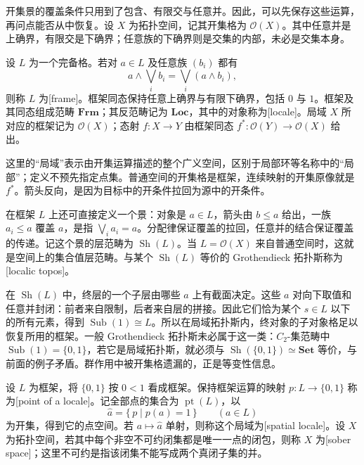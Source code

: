 开集景的覆盖条件只用到了包含、有限交与任意并。因此，可以先保存这些运算，再问点能否从中恢复。设 \(X\) 为拓扑空间，记其开集格为 \(\mathcal O(X)\)。其中任意并是上确界，有限交是下确界；任意族的下确界则是交集的内部，未必是交集本身。

\begin{definition}\label{b4:def:frame-locale}
	设 \(L\) 为一个完备格。若对 \(a\in L\) 及任意族 \((b_i)\) 都有
	\[
		a\wedge\bigvee_i b_i=\bigvee_i(a\wedge b_i),
	\]
	则称 \(L\) 为[frame]。框架同态保持任意上确界与有限下确界，包括 \(0\) 与 \(1\)。框架及其同态组成范畴 \(\mathbf{Frm}\)；其反范畴记为 \(\mathbf{Loc}\)，其中的对象称为[locale]。局域 \(X\) 所对应的框架记为 \(\mathcal O(X)\)；态射 \(f:X\to Y\) 由框架同态 \(f^*:\mathcal O(Y)\to\mathcal O(X)\) 给出。
\end{definition}

这里的“局域”表示由开集运算描述的整个广义空间，区别于局部环等名称中的“局部”；定义不预先指定点集。普通空间的开集格是框架，连续映射的开集原像就是 \(f^*\)。箭头反向，是因为目标中的开条件拉回为源中的开条件。

\ProseParagraphBreak
在框架 \(L\) 上还可直接定义一个景：对象是 \(a\in L\)，箭头由 \(b\le a\) 给出，一族 \(a_i\le a\) 覆盖 \(a\)，是指 \(\bigvee_i a_i=a\)。分配律保证覆盖的拉回，任意并的结合保证覆盖的传递。记这个景的层范畴为 \(\operatorname{Sh}(L)\)。当 \(L=\mathcal O(X)\) 来自普通空间时，这就是空间上的集合值层范畴。与某个 \(\operatorname{Sh}(L)\) 等价的 Grothendieck 拓扑斯称为[localic topos]。

\ProseParagraphBreak
在 \(\operatorname{Sh}(L)\) 中，终层的一个子层由哪些 \(a\) 上有截面决定。这些 \(a\) 对向下取值和任意并封闭：前者来自限制，后者来自层的拼接。因此它们恰为某个 \(s\in L\) 以下的所有元素，得到 \(\operatorname{Sub}(1)\cong L\)。所以在局域拓扑斯内，终对象的子对象格足以恢复所用的框架。一般 Grothendieck 拓扑斯未必属于这一类：\(C_2\)-集范畴中 \(\operatorname{Sub}(1)=\{0,1\}\)，若它是局域拓扑斯，就必须与 \(\operatorname{Sh}(\{0,1\})\simeq\mathbf{Set}\) 等价，与前面的例子矛盾。群作用中被开集格遗漏的，正是等变性信息。

\begin{definition}\label{b4:def:locale-points-sober}
	设 \(L\) 为框架，将 \(\{0,1\}\) 按 \(0<1\) 看成框架。保持框架运算的映射 \(p:L\to\{0,1\}\) 称为[point of a locale]。记全部点的集合为 \(\operatorname{pt}(L)\)，以
	\[
		\widehat a=\{\,p\mid p(a)=1\,\}\qquad(a\in L)
	\]
	为开集，得到它的点空间。若 \(a\mapsto\widehat a\) 单射，则称这个局域为[spatial locale]。设 \(X\) 为拓扑空间，若其中每个非空不可约闭集都是唯一一点的闭包，则称 \(X\) 为[sober space]；这里不可约是指该闭集不能写成两个真闭子集的并。
\end{definition}

